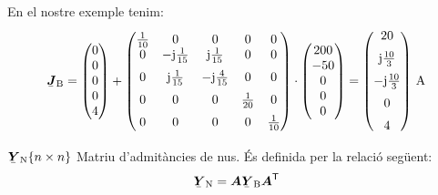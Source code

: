 \begin{list}{}
   En el nostre exemple tenim:
   \[
      \mcmplx{J}\ped{B} =
      \begin{pmatrix} 0 \\ 0 \\ 0 \\ 0 \\ 4 \end{pmatrix} +
       \begin{pmatrix}
            \frac{1}{10} & 0 & 0 & 0 & 0 \\
            0 & -\ju\frac{1}{15} & \ju\frac{1}{15} & 0 & 0 \\[2mm]
            0 & \ju\frac{1}{15} & -\ju\frac{4}{15} & 0 & 0 \\[2mm]
            0 & 0 & 0 & \frac{1}{20} & 0 \\[2mm]
            0 & 0 & 0 & 0 & \frac{1}{10}
      \end{pmatrix} \cdot
      \begin{pmatrix} 200 \\ -50 \\ 0 \\ 0 \\ 0 \end{pmatrix} =
      \begin{pmatrix}
            20 \\[2mm]
             \ju \frac{10}{3} \\[2mm]
             -\ju \frac{10}{3} \\[2mm]
             0 \\[2mm]
              4
      \end{pmatrix}
     \si{\,A}
   \]

   \item[$\mcmplx{Y}\ped{N}\{n\times n\}$] Matriu d'admitàncies de nus. És definida per la relació següent:
   \begin{equation}
      \mcmplx{Y}\ped{N} = \boldsymbol{A} \mcmplx{Y}\ped{B}
      \transp{\boldsymbol{A}}
   \end{equation}


\end{list}
